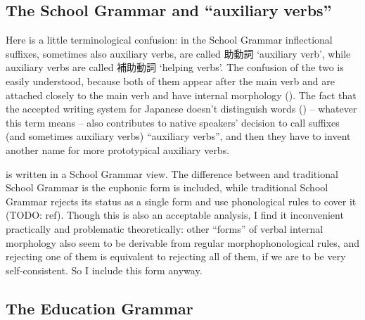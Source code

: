 \documentclass[UTF8, a4paper, oneside, scheme=plain]{ctexrep}
\newcommand{\translate}[1]{`#1'}
\begin{document}
\subsection{The School Grammar and ``auxiliary verbs''}\label{sec:so-called-auxiliary-verb}

Here is a little terminological confusion:
in the School Grammar inflectional suffixes,
sometimes also auxiliary verbs, are called 助動詞 \translate{auxiliary verb},
while auxiliary verbs are called 補助動詞 \translate{helping verbs}.
The confusion of the two is easily understood,
because both of them appear after the main verb
and are attached closely to the main verb 
and have internal morphology ().
The fact that the accepted writing system for Japanese doesn't distinguish words 
() -- whatever this term means -- 
also contributes to native speakers' decision to call suffixes (and sometimes auxiliary verbs) ``auxiliary verbs'',
and then they have to invent another name for more prototypical auxiliary verbs.

 is written in a School Grammar view.
The difference between  and traditional School Grammar 
is the euphonic form is included,
while traditional School Grammar rejects its status as a single form
and use phonological rules to cover it (TODO: ref).
Though this is also an acceptable analysis,
I find it inconvenient practically and problematic theoretically:
other ``forms'' of verbal internal morphology also seem to
be derivable from regular morphophonological rules,
and rejecting one of them is equivalent to rejecting all of them,
if we are to be very self-consistent.
So I include this form anyway.

\subsection{The Education Grammar}
\end{document}
